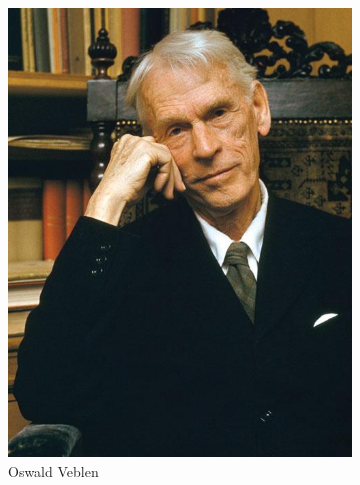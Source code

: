\begin{figure}
\begin{subfigure}{0.5\textwidth}
    \centering
    \includegraphics[scale=0.55]{img/imgintro/veblen.jpg}
    \caption{Oswald Veblen}
    \label{fig:my_label}
\end{subfigure}
\begin{subfigure}{0.5\textwidth}
    \centering

\end{subfigure}
\end{figure}

